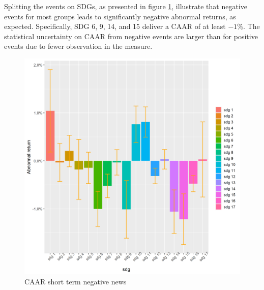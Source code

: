 Splitting the events on SDGs, as presented in figure \ref{fig:ST_neg_bar}, illustrate that negative events for most groups leads to significantly negative abnormal returns, as expected. Specifically, SDG 6, 9, 14, and 15 deliver a CAAR of at least $-1\%$. The statistical uncertainty on CAAR from negative events are larger than for positive events due to fewer observation in the measure.   


\begin{figure} [H]
    \centering
    \includegraphics[scale=0.6]{Projekt/1.Figures analysis/ST_negative_sdg_bar.png}
    \caption{CAAR short term negative news}
    \label{fig:ST_neg_bar}
\end{figure}




